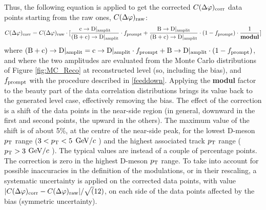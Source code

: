 Thus, the following equation is applied to get the corrected $C(\Delta\varphi)_{\rm corr}$ data points starting from the raw ones, $C(\Delta\varphi)_{\rm raw}$:
\begin{equation}
C(\Delta\varphi)_{\rm corr} = C(\Delta\varphi)_{\rm raw} \cdot [\frac{{\rm c}\rightarrow{\rm D}|_{\rm amplit}}{{\rm (B+c)}\rightarrow{\rm D}|_{\rm amplit}} \cdot f_{\rm prompt} + \frac{{\rm B}\rightarrow{\rm D}|_{\rm amplit}}{{\rm (B+c)}\rightarrow{\rm D}|_{\rm amplit}} \cdot (1-f_{\rm prompt})\cdot\frac{1}{\bf modul}]
\end{equation}
where ${\rm (B+c)}\rightarrow{\rm D}|_{\rm amplit} = {\rm c}\rightarrow{\rm D}|_{\rm amplit} \cdot f_{\rm prompt} + {\rm B}\rightarrow{\rm D}|_{\rm amplit} \cdot (1-f_{\rm prompt})$, and where the two amplitudes are evaluated from the Monte Carlo distributions of Figure \ref{fig:MC_Reco} at reconstructed level (so, including the bias), and $f_{\rm prompt}$ with the procedure described in \ref{feeddown}.
Applying the {\bf modul} factor to the beauty part of the data correlation distributions brings its value back to the generated level case, effectively removing the bias.
The effect of the correction is a shift of the data points in the near-side region (in general, downward in the first and second points, the upward in the others). The maximum value of the shift is of about 5\%, at the centre of the near-side peak, for the lowest D-meson $p_{\rm T}$ range ($3 < p_{\rm T} < 5$ $\mathrm{GeV}/c$ ) and the highest associated track $p_{\rm T}$ range ($p_{\rm T} > 3$ $\mathrm{GeV}/c$ ). The typical values are instead of a couple of percentage points. The correction is zero in the highest D-meson $p_{\rm T}$ range.
To take into account for possible inaccuracies in the definition of the modulations, or in their rescaling, a systematic uncertainty is  applied on the corrected data points, with value $|C(\Delta\varphi)_{\rm corr} - C(\Delta\varphi)_{\rm raw}|/\sqrt(12)$, on each side of the data points affected by the bias (symmetric uncertainty).
 
\clearpage
%
